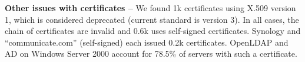 




\textbf{Other issues with certificates --}
We found 1k certificates using X.509 version 1, which is considered deprecated (current standard is version 3). In all cases, the chain of certificates are invalid and 0.6k uses self-signed certificates. Synology and ``communicate.com'' (self-signed) each issued 0.2k certificates. 
OpenLDAP and \gls{AD} on Windows Server 2000 account for 78.5\% of servers with such a certificate.

